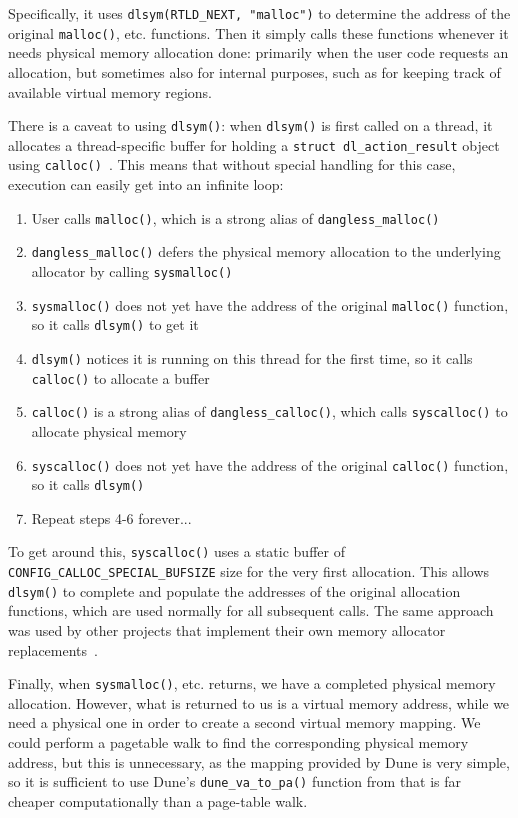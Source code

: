 Specifically, it uses \lstinline!dlsym(RTLD_NEXT, "malloc")! to determine the address of the original \lstinline!malloc()!, etc. functions. Then it simply calls these functions whenever it needs physical memory allocation done: primarily when the user code requests an allocation, but sometimes also for internal purposes, such as for keeping track of available virtual memory regions.

There is a caveat to using \lstinline!dlsym()!: when \lstinline!dlsym()! is first called on a thread, it allocates a thread-specific buffer for holding a \lstinline!struct dl_action_result! object using \lstinline!calloc()!~\cite{glibc-dlsym-calls-calloc}. This means that without special handling for this case, execution can easily get into an infinite loop:

\begin{enumerate}
	\item User calls \lstinline!malloc()!, which is a strong alias of \lstinline!dangless_malloc()!
	\item \lstinline!dangless_malloc()! defers the physical memory allocation to the underlying allocator by calling \lstinline!sysmalloc()!
	\item \lstinline!sysmalloc()! does not yet have the address of the original \lstinline!malloc()! function, so it calls \lstinline!dlsym()! to get it
	\item \lstinline!dlsym()! notices it is running on this thread for the first time, so it calls \lstinline!calloc()! to allocate a buffer
	\item \lstinline!calloc()! is a strong alias of \lstinline!dangless_calloc()!, which calls \lstinline!syscalloc()! to allocate physical memory
	\item \lstinline!syscalloc()! does not yet have the address of the original \lstinline!calloc()! function, so it calls \lstinline!dlsym()!
	\item Repeat steps 4-6 forever...
\end{enumerate}

To get around this, \lstinline!syscalloc()! uses a static buffer of \lstinline!CONFIG_CALLOC_SPECIAL_BUFSIZE! size for the very first allocation. This allows \lstinline!dlsym()! to complete and populate the addresses of the original allocation functions, which are used normally for all subsequent calls. The same approach was used by other projects that implement their own memory allocator replacements~\cite{dlsym-calloc-special-ex1}.

Finally, when \lstinline!sysmalloc()!, etc. returns, we have a completed physical memory allocation. However, what is returned to us is a virtual memory address, while we need a physical one in order to create a second virtual memory mapping. We could perform a pagetable walk to find the corresponding physical memory address, but this is unnecessary, as the mapping provided by Dune is very simple, so it is sufficient to use Dune's \lstinline!dune_va_to_pa()! function from  that is far cheaper computationally than a page-table walk.

